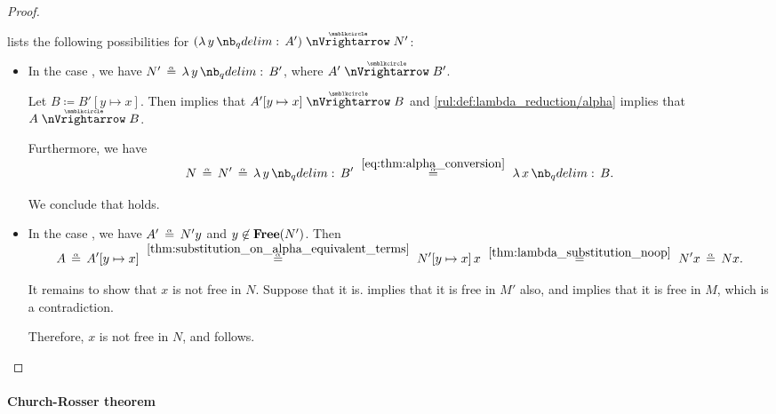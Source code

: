 \begin{proof}
\begin{itemize}
     lists the following possibilities for \( (\qabs y A') \ppred N' \):
    \begin{itemize}
      \item In the case , we have \( N' \aequiv \qabs y B' \), where \( A' \ppred B' \).

      Let \( B \coloneqq B'[y \mapsto x] \). Then  implies that \( A'[y \mapsto x] \ppred B \) and \ref{rul:def:lambda_reduction/alpha} implies that \( A \ppred B \).

      Furthermore, we have
      \begin{equation*}
        N
        \aequiv
        N'
        \aequiv
        \qabs y B'
        \reloset {\eqref{eq:thm:alpha_conversion}} \aequiv
        \qabs x B.
      \end{equation*}

      We conclude that  holds.

      \item In the case , we have \( A' \aequiv N'y \) and \( y \not\in \op*{Free}(N') \). Then
      \begin{equation*}
        A
        \aequiv
        A'[y \mapsto x]
        \reloset {\ref{thm:substitution_on_alpha_equivalent_terms}} \aequiv
        N'[y \mapsto x] \thinspace x
        \reloset {\ref{thm:lambda_substitution_noop}} =
        N' x
        \aequiv
        N x.
      \end{equation*}

      It remains to show that \( x \) is not free in \( N \). Suppose that it is.  implies that it is free in \( M' \) also, and  implies that it is free in \( M \), which is a contradiction.

      Therefore, \( x \) is not free in \( N \), and  follows.
    \end{itemize}
  \end{itemize}
\end{proof}

\paragraph{Church-Rosser theorem}\hfill

